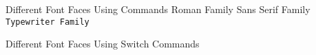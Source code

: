 \documentclass{article}
\begin{document}
Different Font Faces Using Commands
\textrm{Roman Family}
\textsf{Sans Serif Family}
\texttt{Typewriter Family}

Different Font Faces Using Switch Commands
\end{document}
